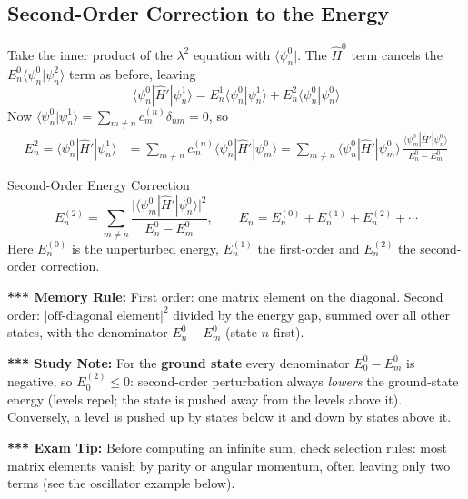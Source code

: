 \documentclass[11pt,a4paper]{article}
\begin{document}
\subsection{Second-Order Correction to the Energy}
Take the inner product of the $\lambda^2$ equation with $\langle\psi_n^0|$. The $\hat H^0$ term cancels the $E_n^0\langle\psi_n^0|\psi_n^2\rangle$ term as before, leaving
\[
\langle\psi_n^0|\hat H'|\psi_n^1\rangle = E_n^1\langle\psi_n^0|\psi_n^1\rangle + E_n^2\langle\psi_n^0|\psi_n^0\rangle
\]
Now $\langle\psi_n^0|\psi_n^1\rangle = \sum_{m\ne n}c_m^{(n)}\delta_{nm} = 0$, so
\begin{align*}
E_n^2 = \langle\psi_n^0|\hat H'|\psi_n^1\rangle
&= \sum_{m\ne n} c_m^{(n)}\langle\psi_n^0|\hat H'|\psi_m^0\rangle
= \sum_{m\ne n}\langle\psi_n^0|\hat H'|\psi_m^0\rangle\,\frac{\langle\psi_m^0|\hat H'|\psi_n^0\rangle}{E_n^0 - E_m^0}
\end{align*}
\begin{thm}{Second-Order Energy Correction}
\[
E_n^{(2)} = \sum_{m\ne n}\frac{\big|\langle\psi_m^0|\hat H'|\psi_n^0\rangle\big|^2}{E_n^0 - E_m^0},
\qquad
E_n = E_n^{(0)} + E_n^{(1)} + E_n^{(2)} + \cdots
\]
Here $E_n^{(0)}$ is the unperturbed energy, $E_n^{(1)}$ the first-order and $E_n^{(2)}$ the second-order correction.
\end{thm}
\textbf{*** Memory Rule:} First order: one matrix element on the diagonal. Second order: $|\text{off-diagonal element}|^2$ divided by the energy gap, summed over all other states, with the denominator $E_n^0 - E_m^0$ (state $n$ first).

\textbf{*** Study Note:} For the \textbf{ground state} every denominator $E_0^0 - E_m^0$ is negative, so $E_0^{(2)}\le 0$: second-order perturbation always \textit{lowers} the ground-state energy (levels repel; the state is pushed away from the levels above it). Conversely, a level is pushed up by states below it and down by states above it.

\textbf{*** Exam Tip:} Before computing an infinite sum, check selection rules: most matrix elements vanish by parity or angular momentum, often leaving only two terms (see the oscillator example below).
\end{document}
